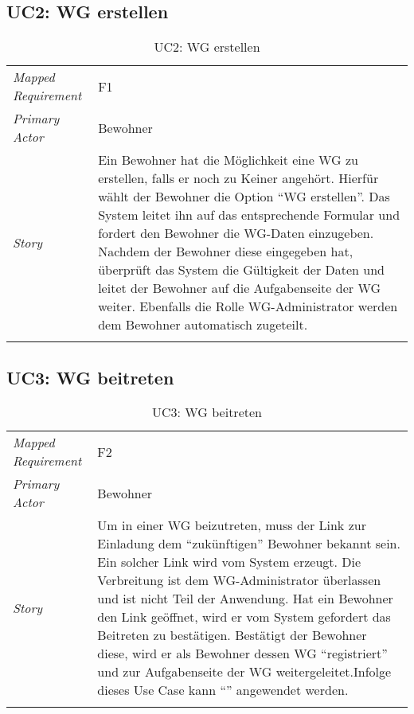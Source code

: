 \subsection{UC2: WG erstellen}\label{subsec:uc2}
\begin{table}[H]
	\tablestyle
	\tablealtcolored
	\begin{tabularx}{\textwidth}{lX}
		\tablebody
			\textit{Mapped Requirement} &
			F1
			\tabularnewline
			\textit{Primary Actor} &
			Bewohner
			\tabularnewline
			\textit{Story} &
			Ein Bewohner hat die Möglichkeit eine WG zu erstellen, falls er noch zu Keiner angehört. Hierfür wählt der Bewohner die Option ``WG erstellen''. Das System leitet ihn auf das entsprechende Formular und fordert den Bewohner die WG-Daten einzugeben. Nachdem der Bewohner diese eingegeben hat, überprüft das System die Gültigkeit der Daten und leitet der Bewohner auf die Aufgabenseite der WG weiter. Ebenfalls die Rolle WG-Administrator werden dem Bewohner automatisch zugeteilt.
			\tabularnewline
		\tableend
	\end{tabularx}
	\caption{UC2: WG erstellen}
\end{table}


\subsection{UC3: WG beitreten}\label{subsec:uc3}
\begin{table}[H]
	\tablestyle
	\tablealtcolored
	\begin{tabularx}{\textwidth}{lX}
		\tablebody
			\textit{Mapped Requirement} &
			F2
			\tabularnewline
			\textit{Primary Actor} &
			Bewohner
			\tabularnewline
			\textit{Story} &
			Um in einer WG beizutreten, muss der Link zur Einladung dem ``zukünftigen'' Bewohner bekannt sein. Ein solcher Link wird vom System erzeugt. Die Verbreitung ist dem WG-Administrator überlassen und ist nicht Teil der Anwendung. Hat ein Bewohner den Link geöffnet, wird er vom System gefordert das Beitreten zu bestätigen. Bestätigt der Bewohner diese, wird er als Bewohner dessen WG ``registriert'' und zur Aufgabenseite der WG weitergeleitet.\newline Infolge dieses Use Case kann ``\nameref{subsec:uc11}'' angewendet werden.
			\tabularnewline
		\tableend
	\end{tabularx}
	\caption{UC3: WG beitreten}
\end{table}


